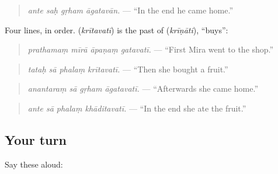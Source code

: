 \begin{quote}
\textbf{   }
\end{quote}

\begin{quote}
\emph{ante saḥ gṛham āgatavān.} — \textquotedblleft{}In the end he came home.\textquotedblright{}
\end{quote}

Four lines, in order. \textbf{} (\emph{krītavatī}) is the past of \textbf{} (\emph{krīṇāti}), \textquotedblleft{}buys\textquotedblright{}:

\begin{quote}
\textbf{   }
\end{quote}

\begin{quote}
\emph{prathamaṃ mīrā āpaṇaṃ gatavatī.} — \textquotedblleft{}First Mira went to the shop.\textquotedblright{}
\end{quote}

\begin{quote}
\textbf{   }
\end{quote}

\begin{quote}
\emph{tataḥ sā phalaṃ krītavatī.} — \textquotedblleft{}Then she bought a fruit.\textquotedblright{}
\end{quote}

\begin{quote}
\textbf{   }
\end{quote}

\begin{quote}
\emph{anantaraṃ sā gṛham āgatavatī.} — \textquotedblleft{}Afterwards she came home.\textquotedblright{}
\end{quote}

\begin{quote}
\textbf{   }
\end{quote}

\begin{quote}
\emph{ante sā phalaṃ khāditavatī.} — \textquotedblleft{}In the end she ate the fruit.\textquotedblright{}
\end{quote}

\subsection*{Your turn}
Say these aloud:

